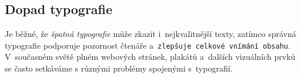 \documentclass[a4paper, 11pt]{article}
\begin{document}
\subsection{Dopad typografie}
Je běžné, že \emph{špatná typografie} může zkazit i~nejkvalitnější texty, zatímco správná typografie podporuje pozornost čtenáře a~\texttt{zlepšuje celkové vnímání obsahu}. V~současném světě plném webových stránek, plakátů a~dalších vizuálních prvků se často setkáváme s různými problémy spojenými s~typografií.\cite{RichTim2003Wtbt}

\newpage
	
	\renewcommand{\refname}{Použité zdroje:}
	
\end{document}
